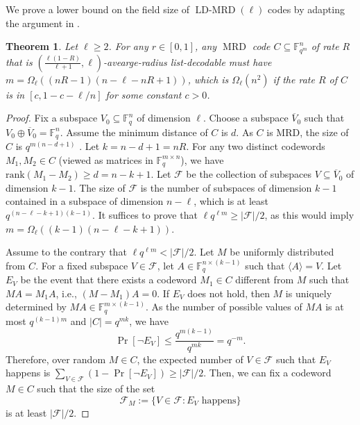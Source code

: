 \documentclass[11pt]{article}
\newif\ifmynotes
\newcommand{\ZGnote}[1]{\ifmynotes\textcolor{purple}{[Zeyu: #1]}\else\fi}
\newcommand{\CYnote}[1]{\ifmynotes\textcolor{orange}{[Chen: #1]}\else\fi}
\newcommand{\ZZnote}[1]{\ifmynotes\textcolor{violet}{[Zihan: #1]}\else\fi}
\theoremstyle{plain}
\newtheorem{thm}{Theorem}[section]
\theoremstyle{definition}
\theoremstyle{remark}
\newcommand{\F}{\mathbb{F}}
\newcommand{\rank}{\mathrm{rank}}
\def \mF {\mathcal{F}}
\begin{document}
We prove a lower bound on the field size of $\operatorname{LD-MRD}(\ell)$ codes by adapting
the argument in \cite{alrabiah2023ag}. 

\begin{thm}\label{A.1}
Let $\ell\geq 2$.
For any $r\in [0,1]$, any $\operatorname{MRD}$ code $C\subseteq \F_{q^m}^n$ of rate $R$ that is $\left(\frac{\ell\left(1-R\right)}{\ell+1}, \ell\right)$-avearge-radius list-decodable must have $m=\Omega_{\ell}((nR-1)(n-\ell-nR+1))$, which is $\Omega_{\ell}(n^2)$ if the rate $R$ of $C$ is in $[c, 1-c-\ell/n]$ for some constant $c>0$. %
\end{thm}
\begin{proof}
Fix a subspace $V_0\subseteq \F_q^n$ of dimension $\ell$. Choose a subspace $\overline{V}_0$ such that $V_0\oplus \overline{V}_0=\F_q^n$. Assume the minimum distance of $C$ is $d$. As $C$ is MRD, the size of $C$ is $q^{m(n-d+1)}$ \cite[Theorem 5.4]{Del}. %
Let $k=n-d+1=nR$. 
For any two distinct codewords $M_1,M_2\in C$ (viewed as matrices in $\F_q^{m\times n}$), we have $\rank(M_1-M_2)\geq d=n-k+1$.
Let $\mF$ be the collection of subspaces $V\subseteq \overline{V}_0$ of dimension $k-1$. The size of $\mF$ is the number of subspaces of dimension $k-1$ contained in a subspace of dimension $n-\ell$, which is at least $q^{(n-\ell-k+1)(k-1)}$. %
It suffices to prove that $\ell q^{\ell m}\geq |\mF|/2$, as this would imply $m=\Omega_{\ell}((k-1)(n-\ell-k+1))$. 

Assume to the contrary that $\ell q^{\ell m}<|\mF|/2$. Let $M$ be uniformly distributed from $C$. For a fixed subspace $V\in \mF$, let $A\in \F_q^{n\times (k-1)}$ such that $\langle A\rangle=V$. Let $E_V$ be the event that there exists a codeword $M_1\in C$ different from $M$ such that $MA=M_1A$, i.e., $(M-M_1)A=0$. 
If $E_V$ does not hold, then $M$ is uniquely determined by $MA\in \F_{q}^{m\times{(k-1)}}$. As the number of possible values of $M A$ is at most $q^{(k-1)m}$ and $|C|=q^{mk}$, we have
\[
\Pr[\lnot E_V]\leq \frac{q^{m(k-1)}}{q^{mk}}=q^{-m}. 
\]
Therefore, over random $M\in C$, the expected number of $V\in \mF$ such that $E_V$ happens is $\sum_{V\in \mF}(1-\Pr[\lnot E_V])\geq |\mF|/2$. %
Then, we can fix a codeword $M\in C$ such that the size of the set 
\[
\mF_M:=\{V\in \mF: E_V \text{ happens}\}
\]
is at least $|\mF|/2$.


\end{proof}
\end{document}
